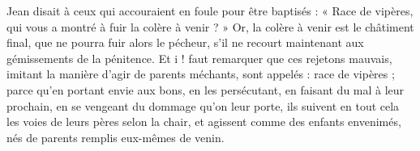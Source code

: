 Jean disait à ceux qui accouraient en foule pour être baptisés : « Race de vipères, qui vous a montré à fuir la colère à venir ? » Or, la colère à venir est le châtiment final, que ne pourra fuir alors le pécheur, s’il ne recourt maintenant aux gémissements de la pénitence. Et i ! faut remarquer que ces rejetons mauvais, imitant la manière d’agir de parents méchants, sont appelés : race de vipères ; parce qu’en portant envie aux bons, en les persécutant, en faisant du mal à leur prochain, en se vengeant du dommage qu’on leur porte, ils suivent en tout cela les voies de leurs pères selon la chair, et agissent comme des enfants envenimés, nés de parents remplis eux-mêmes de venin.